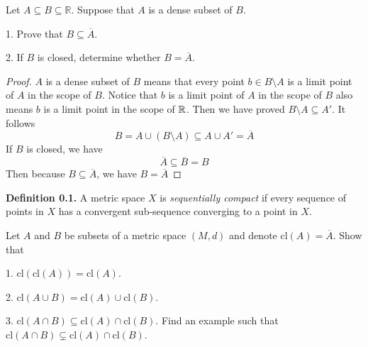 \documentclass{report}
\begin{document}
\begin{question}{}{}
Let \( A \subseteq B \subseteq \mathbb{R} \). Suppose that \( A \) is a dense subset of \( B \).

1. Prove that \( B \subseteq \overline{A} \).

2. If \( B \) is closed, determine whether \( B = \overline{A} \).
\end{question}
\begin{proof}
$A$ is a dense subset of $B$ means that every point $b\in B\setminus A$ is a limit point of $A$ in the scope of $B$. Notice that $b$ is a limit point of  $A$ in the scope of $B$ also means $b$ is a limit point in the scope of $\mathbb{R}$. Then we have proved $B\setminus A\subseteq A'$. It follows
\begin{equation}
B=A \cup (B\setminus A)\subseteq A\cup A'=\overline{A}
\end{equation}
If $B$ is closed, we have
 \begin{equation}
\overline{A}\subseteq \overline{B}=B
\end{equation}
Then because $B\subseteq \overline{A}$, we have $B=\overline{A}$



\end{proof}
\textbf{Definition 0.1.} A metric space \( X \) is \textit{sequentially compact} if every sequence of points in \( X \) has a convergent sub-sequence converging to a point in \( X \).
\begin{question}{}{}

Let \( A \) and \( B \) be subsets of a metric space \( (M, d) \) and denote \( \text{cl}(A) = \overline{A} \). Show that

1. \( \text{cl}(\text{cl}(A)) = \text{cl}(A) \).

2. \( \text{cl}(A \cup B) = \text{cl}(A) \cup \text{cl}(B) \).

3. \( \text{cl}(A \cap B) \subseteq \text{cl}(A) \cap \text{cl}(B) \). Find an example such that \( \text{cl}(A \cap B) \subsetneq \text{cl}(A) \cap \text{cl}(B) \).
\end{question}
\end{document}
